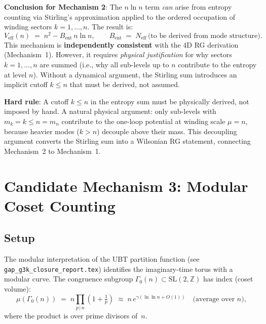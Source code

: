 \documentclass[12pt,a4paper]{article}
\theoremstyle{definition}
\theoremstyle{remark}
\newcommand{\ZZ}{\mathbb{Z}}
\newcommand{\Neff}{N_{\mathrm{eff}}}
\begin{document}
\begin{resultbox}
\textbf{Conclusion for Mechanism 2}: The $n\ln n$ term \emph{can} arise from
entropy counting via Stirling's approximation applied to the ordered occupation
of winding sectors $k = 1, \ldots, n$.  The result is:
\[
  V_\mathrm{eff}(n) \;=\; n^2 - B_\mathrm{ent}\,n\ln n,
  \qquad
  B_\mathrm{ent} \;=\; \Neff\,\text{(to be derived from mode structure)}.
\]
This mechanism is \textbf{independently consistent} with the 4D RG derivation
(Mechanism~1).  However, it requires \emph{physical justification} for why
sectors $k=1,\ldots,n$ are summed (i.e., why all sub-levels up to $n$ contribute
to the entropy at level $n$).  Without a dynamical argument, the Stirling sum
introduces an implicit cutoff $k \le n$ that must be derived, not assumed.
\end{resultbox}

\begin{warnbox}
\textbf{Hard rule}: A cutoff $k \le n$ in the entropy sum must be physically
derived, not imposed by hand.  A natural physical argument: only sub-levels
with $m_k = k \le n = m_n$ contribute to the one-loop potential at winding
scale $\mu = n$, because heavier modes ($k > n$) decouple above their mass.
This decoupling argument converts the Stirling sum into a Wilsonian RG statement,
connecting Mechanism~2 to Mechanism~1.
\end{warnbox}

\section{Candidate Mechanism 3: Modular Coset Counting}
\label{sec:nlogn:modular}

\subsection{Setup}
\label{ssec:nlogn:mod_setup}

The modular interpretation of the UBT partition function (see
\texttt{gap\_g3k\_closure\_report.tex}) identifies the imaginary-time torus
with a modular curve.  The congruence subgroup $\Gamma_0(n) \subset \mathrm{SL}(2,\ZZ)$
has index (coset volume):
\begin{equation}
  \mu(\Gamma_0(n))
  \;=\; n\prod_{p\,|\,n}\!\left(1 + \tfrac{1}{p}\right)
  \;\approx\; n\,e^{\gamma(\ln\ln n + O(1))}
  \quad\text{(average over }n\text{)},
  \label{eq:nlogn:mu_Gamma0}
\end{equation}
where the product is over prime divisors of~$n$.
\end{document}
